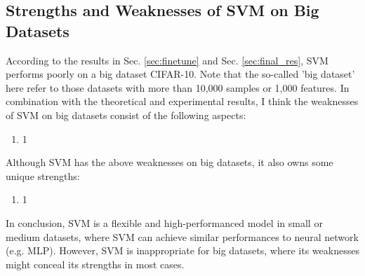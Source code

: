 \documentclass[12pt,a4paper]{article}
\theoremstyle{definition}
\begin{document}
\subsection{Strengths and Weaknesses of SVM on Big Datasets}

According to the results in Sec. \ref{sec:finetune} and Sec. \ref{sec:final_res}, SVM performs poorly on a big dataset CIFAR-10. Note that the so-called 'big dataset' here refer to those datasets with more than 10,000 samples or 1,000 features. In combination with the theoretical and experimental results, I think the weaknesses of SVM on big datasets consist of the following aspects:

\begin{enumerate}
	\item 1
\end{enumerate}

Although SVM has the above weaknesses on big datasets, it also owns some unique strengths:

\begin{enumerate}
	\item 1
\end{enumerate}

In conclusion, SVM is a flexible and high-performanced model in small or medium datasets, where SVM can achieve similar performances to neural network (e.g. MLP). However, SVM is inappropriate for big datasets, where its weaknesses might conceal its strengths in most cases.
\end{document}
